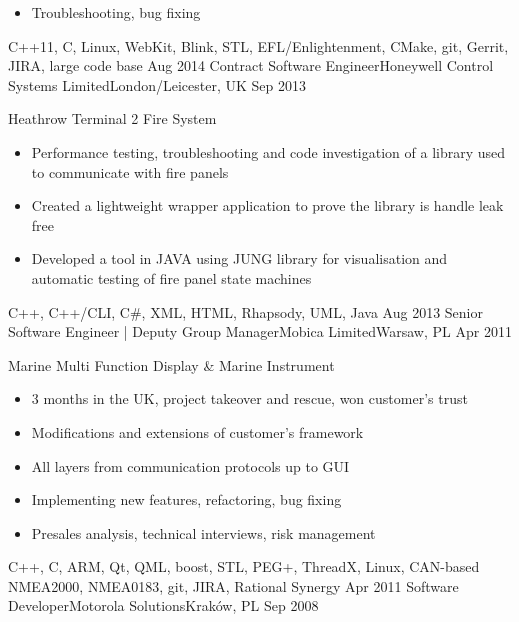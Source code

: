 \begin{experiences}
{\begin{itemize}
                        \item Troubleshooting, bug fixing
                      \end{itemize}
                    }
                    {C++11, C, Linux, WebKit, Blink, STL, EFL/Enlightenment, CMake, git, Gerrit, JIRA, large code base}
  \emptySeparator         
  \experience
  {Aug 2014}  {Contract Software Engineer}{Honeywell Control Systems Limited}{London/Leicester, UK}
  {Sep 2013}   {
                      Heathrow Terminal 2 Fire System  
                      \begin{itemize}
                        \item Performance testing, troubleshooting and code investigation of a library used to communicate with fire panels
                        \item Created a lightweight wrapper application to prove the library is handle leak free
                        \item Developed a tool in JAVA using JUNG library for visualisation and automatic testing of fire panel state machines
                      \end{itemize}
                  }
                  {C++, C++/CLI, C\#, XML, HTML, Rhapsody, UML, Java}  
  \emptySeparator         
  \experience
  {Aug 2013}  {Senior Software Engineer | Deputy Group Manager}{Mobica Limited}{Warsaw, PL}
  {Apr 2011}   {
                      Marine Multi Function Display \& Marine Instrument
                      \begin{itemize}
                        \item 3 months in the UK, project takeover and rescue, won customer's trust
                        \item Modifications and extensions of customer's framework
                        \item All layers from communication protocols up to GUI
                        \item Implementing new features, refactoring, bug fixing
                        \item Presales analysis, technical interviews, risk management
                      \end{itemize}
                  }
                  {C++, C, ARM, Qt, QML, boost, STL, PEG+, ThreadX, Linux, CAN-based NMEA2000, NMEA0183, git, JIRA, Rational Synergy}
    \emptySeparator         
    \experience
    {Apr 2011}  {Software Developer}{Motorola Solutions}{Kraków, PL}
    {Sep 2008}   {
                        \begin{itemize}

\end{itemize}}
\end{experiences}
